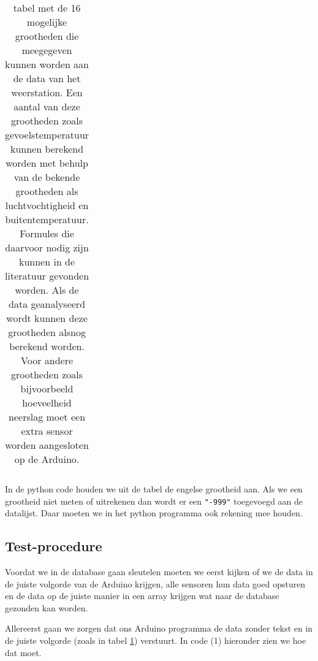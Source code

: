 \begin{center}
\begin{table}
\begin{tabular}{ | l | l | l|}
   \end{tabular}
   \caption{tabel met de 16 mogelijke grootheden die meegegeven kunnen worden aan
   de data van het weerstation. Een aantal van deze grootheden zoals gevoelstemperatuur
   kunnen berekend worden met behulp van de bekende grootheden als luchtvochtigheid
   en buitentemperatuur. Formules die daarvoor nodig zijn kunnen in de literatuur gevonden worden.
   Als de data geanalyseerd wordt kunnen deze grootheden alsnog berekend worden.
   Voor andere grootheden zoals bijvoorbeeld hoeveelheid neerslag moet 
   een extra sensor worden aangesloten op de Arduino.}
   \label{table:grootheden}
\end{table}
\end{center}

In de python code houden we uit de tabel de engelse grootheid aan. Als we een grootheid
niet meten of uitrekenen dan wordt er een \verb|"-999"| toegevoegd aan de datalijst.
Daar moeten we in het python programma ook rekening mee houden.

\subsection{Test-procedure} 
Voordat we in de database gaan sleutelen moeten we eerst kijken of we de
data in de juiste volgorde van de Arduino krijgen, alle sensoren hun data goed opsturen
en de data op de juiste manier in een array krijgen wat naar de \hisparc database 
gezonden kan worden.

Allereerst gaan we zorgen dat ons Arduino programma de data zonder tekst en 
in de juiste volgorde (zoals in tabel \ref{table:grootheden}) verstuurt. 
In code (1) hieronder zien we hoe dat moet.

